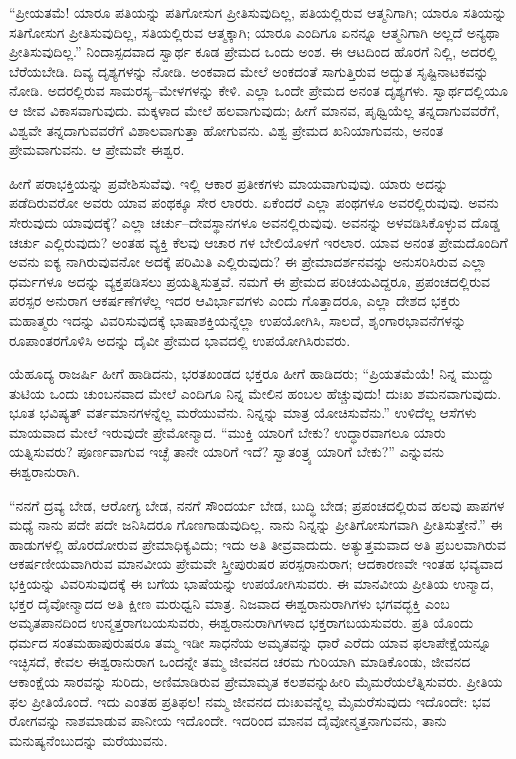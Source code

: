 “ಪ್ರೀಯತಮೆ! ಯಾರೂ ಪತಿಯನ್ನು ಪತಿಗೋಸುಗ ಪ್ರೀತಿಸುವುದಿಲ್ಲ, ಪತಿಯಲ್ಲಿರುವ ಆತ್ಮನಿಗಾಗಿ; ಯಾರೂ ಸತಿಯನ್ನು ಸತಿಗೋಸುಗ ಪ್ರೀತಿಸುವುದಿಲ್ಲ, ಸತಿಯಲ್ಲಿರುವ ಆತ್ಮಕ್ಕಾಗಿ; ಯಾರೂ ಎಂದಿಗೂ ಏನನ್ನೂ ಆತ್ಮನಿಗಾಗಿ ಅಲ್ಲದೆ ಅನ್ಯಥಾ ಪ್ರೀತಿಸುವುದಿಲ್ಲ.” ನಿಂದಾಸ್ಪದವಾದ ಸ್ವಾರ್ಥ ಕೂಡ ಪ್ರೇಮದ ಒಂದು ಅಂಶ. ಈ ಆಟದಿಂದ ಹೊರಗೆ ನಿಲ್ಲಿ, ಅದರಲ್ಲಿ ಬೆರೆಯಬೇಡಿ. ದಿವ್ಯ ದೃಶ್ಯಗಳನ್ನು ನೋಡಿ. ಅಂಕವಾದ ಮೇಲೆ ಅಂಕದಂತೆ ಸಾಗುತ್ತಿರುವ ಅದ್ಭುತ ಸೃಷ್ಟಿನಾಟಕವನ್ನು ನೋಡಿ. ಅದರಲ್ಲಿರುವ ಸಾಮರಸ್ಯ–ಮೇಳಗಳನ್ನು ಕೇಳಿ. ಎಲ್ಲಾ ಒಂದೇ ಪ್ರೇಮದ ಅನಂತ ದೃಶ್ಯಗಳು. ಸ್ವಾರ್ಥದಲ್ಲಿಯೂ ಆ ಜೀವ ವಿಕಾಸವಾಗುವುದು. ಮಕ್ಕಳಾದ ಮೇಲೆ ಹಲವಾಗುವುದು; ಹೀಗೆ ಮಾನವ, ಪೃಥ್ವಿಯೆಲ್ಲ ತನ್ನದಾಗುವವರೆಗೆ, ವಿಶ್ವವೇ ತನ್ನದಾಗುವವರೆಗೆ ವಿಶಾಲವಾಗುತ್ತಾ ಹೋಗುವನು. ವಿಶ್ವ ಪ್ರೇಮದ ಖನಿಯಾಗುವನು, ಅನಂತ ಪ್ರೇಮವಾಗುವನು. ಆ ಪ್ರೇಮವೇ ಈಶ್ವರ.

ಹೀಗೆ ಪರಾಭಕ್ತಿಯನ್ನು ಪ್ರವೇಶಿಸುವೆವು. ಇಲ್ಲಿ ಆಕಾರ ಪ್ರತೀಕಗಳು ಮಾಯವಾಗುವುವು. ಯಾರು ಅದನ್ನು ಪಡೆದಿರುವರೋ ಅವರು ಯಾವ ಪಂಥಕ್ಕೂ ಸೇರ ಲಾರರು. ಏಕೆಂದರೆ ಎಲ್ಲಾ ಪಂಥಗಳೂ ಅವರಲ್ಲಿರುವುವು. ಅವನು ಸೇರುವುದು ಯಾವುದಕ್ಕೆ? ಎಲ್ಲಾ ಚರ್ಚು–ದೇವಸ್ಥಾನಗಳೂ ಅವನಲ್ಲಿರುವುವು. ಅವನನ್ನು ಅಳವಡಿಸಿಕೊಳ್ಳುವ ದೊಡ್ಡ ಚರ್ಚು ಎಲ್ಲಿರುವುದು? ಅಂತಹ ವ್ಯಕ್ತಿ ಕೆಲವು ಆಚಾರ ಗಳ ಬೇಲಿಯೊಳಗೆ ಇರಲಾರ. ಯಾವ ಅನಂತ ಪ್ರೇಮದೊಂದಿಗೆ ಅವನು ಐಕ್ಯ ನಾಗಿರುವುವನೋ ಅದಕ್ಕೆ ಪರಿಮಿತಿ ಎಲ್ಲಿರುವುದು? ಈ ಪ್ರೇಮಾದರ್ಶನವನ್ನು ಅನುಸರಿಸಿರುವ ಎಲ್ಲಾ ಧರ್ಮಗಳೂ ಅದನ್ನು ವ್ಯಕ್ತಪಡಿಸಲು ಪ್ರಯತ್ನಿಸುತ್ತವೆ. ನಮಗೆ ಈ ಪ್ರೇಮದ ಪರಿಚಯವಿದ್ದರೂ, ಪ್ರಪಂಚದಲ್ಲಿರುವ ಪರಸ್ಪರ ಅನುರಾಗ ಆಕರ್ಷಣೆಗಳೆಲ್ಲ ಇದರ ಆವಿರ್ಭಾವಗಳು ಎಂದು ಗೊತ್ತಾದರೂ, ಎಲ್ಲಾ ದೇಶದ ಭಕ್ತರು ಮಹಾತ್ಮರು ಇದನ್ನು ವಿವರಿಸುವುದಕ್ಕೆ ಭಾಷಾಶಕ್ತಿಯನ್ನೆಲ್ಲಾ ಉಪಯೋಗಿಸಿ, ಸಾಲದೆ, ಶೃಂಗಾರಭಾವನೆಗಳನ್ನು ರೂಪಾಂತರಗೊಳಿಸಿ ಅದನ್ನು ದೈವೀ ಪ್ರೇಮದ ಭಾವದಲ್ಲಿ ಉಪಯೋಗಿಸಿರುವರು.

ಯೆಹೂದ್ಯ ರಾಜರ್ಷಿ ಹೀಗೆ ಹಾಡಿದನು, ಭರತಖಂಡದ ಭಕ್ತರೂ ಹೀಗೆ ಹಾಡಿದರು; “ಪ್ರಿಯತಮೆಯೆ! ನಿನ್ನ ಮುದ್ದು ತುಟಿಯ ಒಂದು ಚುಂಬನವಾದ ಮೇಲೆ ಎಂದಿಗೂ ನಿನ್ನ ಮೇಲಿನ ಹಂಬಲ ಹೆಚ್ಚುವುದು! ದುಃಖ ಶಮನವಾಗುವುದು. ಭೂತ ಭವಿಷ್ಯತ್​ ವರ್ತಮಾನಗಳನ್ನೆಲ್ಲ ಮರೆಯುವೆನು. ನಿನ್ನನ್ನು ಮಾತ್ರ ಯೋಚಿಸುವೆನು.” ಉಳಿದೆಲ್ಲ ಆಸೆಗಳು ಮಾಯವಾದ ಮೇಲೆ ಇರುವುದೇ ಪ್ರೇಮೋನ್ಮಾದ. “ಮುಕ್ತಿ ಯಾರಿಗೆ ಬೇಕು? ಉದ್ಧಾರವಾಗಲೂ ಯಾರು ಯತ್ನಿಸುವರು? ಪೂರ್ಣವಾಗುವ ಇಚ್ಛೆ ತಾನೇ ಯಾರಿಗೆ ಇದೆ? ಸ್ವಾತಂತ್ರ್ಯ ಯಾರಿಗೆ ಬೇಕು?” ಎನ್ನುವನು ಈಶ್ವರಾನುರಾಗಿ.

“ನನಗೆ ದ್ರವ್ಯ ಬೇಡ, ಆರೋಗ್ಯ ಬೇಡ, ನನಗೆ ಸೌಂದರ್ಯ ಬೇಡ, ಬುದ್ಧಿ ಬೇಡ; ಪ್ರಪಂಚದಲ್ಲಿರುವ ಹಲವು ಪಾಪಗಳ ಮಧ್ಯೆ ನಾನು ಪದೇ ಪದೇ ಜನಿಸಿದರೂ ಗೊಣಗಾಡುವುದಿಲ್ಲ. ನಾನು ನಿನ್ನನ್ನು ಪ್ರೀತಿಗೋಸುಗವಾಗಿ ಪ್ರೀತಿಸುತ್ತೇನೆ.” ಈ ಹಾಡುಗಳಲ್ಲಿ ಹೊರದೋರುವ ಪ್ರೇಮಾಧಿಕ್ಯವಿದು; ಇದು ಅತಿ ತೀವ್ರವಾದುದು. ಅತ್ಯುತ್ತಮವಾದ ಅತಿ ಪ್ರಬಲವಾಗಿರುವ ಆಕರ್ಷಣೀಯವಾಗಿರುವ ಮಾನವೀಯ ಪ್ರೇಮವೇ ಸ್ತ್ರೀಪುರುಷರ ಪರಸ್ಪರಾನುರಾಗ; ಆದಕಾರಣವೇ ಇಂತಹ ಭವ್ಯವಾದ ಭಕ್ತಿಯನ್ನು ವಿವರಿಸುವುದಕ್ಕೆ ಈ ಬಗೆಯ ಭಾಷೆಯನ್ನು ಉಪಯೋಗಿಸುವರು. ಈ ಮಾನವೀಯ ಪ್ರೀತಿಯ ಉನ್ಮಾದ, ಭಕ್ತರ ದೈವೋನ್ಮಾದದ ಅತಿ ಕ್ಷೀಣ ಮರುಧ್ವನಿ ಮಾತ್ರ. ನಿಜವಾದ ಈಶ್ವರಾನುರಾಗಿಗಳು ಭಗವದ್ಭಕ್ತಿ ಎಂಬ ಅಮೃತಪಾನದಿಂದ ಉನ್ಮತ್ತರಾಗಬಯಸುವರು, ಈಶ್ವರಾನುರಾಗಿಗಳಾದ ಭಕ್ತರಾಗಬಯಸುವರು. ಪ್ರತಿ ಯೊಂದು ಧರ್ಮದ ಸಂತಮಹಾಪುರುಷರೂ ತಮ್ಮ ಇಡೀ ಸಾಧನೆಯ ಅಮೃತವನ್ನು ಧಾರೆ ಎರೆದು ಯಾವ ಫಲಾಪೇಕ್ಷೆಯನ್ನೂ ಇಚ್ಛಿಸದೆ, ಕೇವಲ ಈಶ್ವರಾನುರಾಗ ಒಂದನ್ನೇ ತಮ್ಮ ಜೀವನದ ಚರಮ ಗುರಿಯಾಗಿ ಮಾಡಿಕೊಂಡು, ಜೀವನದ ಆಕಾಂಕ್ಷೆಯ ಸಾರವನ್ನು ಸುರಿದು, ಅಣಿಮಾಡಿರುವ ಪ್ರೇಮಾಮೃತ ಕಲಶವನ್ನುಹೀರಿ ಮೈಮರೆಯಲೆತ್ನಿಸುವರು. ಪ್ರೀತಿಯ ಫಲ ಪ್ರೀತಿಯೊಂದೆ. ಇದು ಎಂತಹ ಪ್ರತಿಫಲ! ನಮ್ಮ ಜೀವನದ ದುಃಖವನ್ನೆಲ್ಲ ಮೈಮರೆಸುವುದು ಇದೊಂದೇ: ಭವ ರೋಗವನ್ನು ನಾಶಮಾಡುವ ಪಾನೀಯ ಇದೊಂದೇ. ಇದರಿಂದ ಮಾನವ ದೈವೋನ್ಮತ್ತನಾಗುವನು, ತಾನು ಮನುಷ್ಯನೆಂಬುದನ್ನು ಮರೆಯುವನು.

